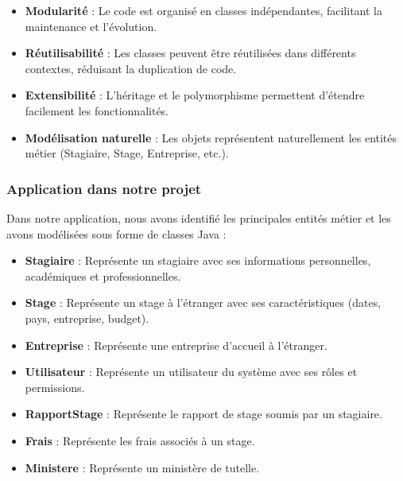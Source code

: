 \documentclass[12pt,a4paper]{report}
\begin{document}
\begin{itemize}[leftmargin=1cm]
    \item \textbf{Modularité} : Le code est organisé en classes indépendantes, facilitant la maintenance et l'évolution.
    
    \item \textbf{Réutilisabilité} : Les classes peuvent être réutilisées dans différents contextes, réduisant la duplication de code.
    
    \item \textbf{Extensibilité} : L'héritage et le polymorphisme permettent d'étendre facilement les fonctionnalités.
    
    \item \textbf{Modélisation naturelle} : Les objets représentent naturellement les entités métier (Stagiaire, Stage, Entreprise, etc.).
\end{itemize}

\subsubsection{Application dans notre projet}

Dans notre application, nous avons identifié les principales entités métier et les avons modélisées sous forme de classes Java :

\begin{itemize}[leftmargin=1cm]
    \item \textbf{Stagiaire} : Représente un stagiaire avec ses informations personnelles, académiques et professionnelles.
    
    \item \textbf{Stage} : Représente un stage à l'étranger avec ses caractéristiques (dates, pays, entreprise, budget).
    
    \item \textbf{Entreprise} : Représente une entreprise d'accueil à l'étranger.
    
    \item \textbf{Utilisateur} : Représente un utilisateur du système avec ses rôles et permissions.
    
    \item \textbf{RapportStage} : Représente le rapport de stage soumis par un stagiaire.
    
    \item \textbf{Frais} : Représente les frais associés à un stage.
    
    \item \textbf{Ministere} : Représente un ministère de tutelle.
\end{itemize}
\end{document}
